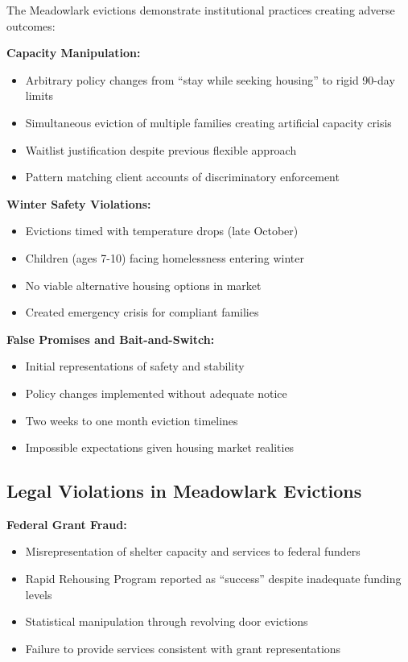 \documentclass[12pt,oneside]{article}
\begin{document}
The Meadowlark evictions demonstrate institutional practices creating adverse outcomes:

\textbf{Capacity Manipulation:}
\begin{itemize}
\item Arbitrary policy changes from ``stay while seeking housing'' to rigid 90-day limits
\item Simultaneous eviction of multiple families creating artificial capacity crisis
\item Waitlist justification despite previous flexible approach
\item Pattern matching client accounts of discriminatory enforcement
\end{itemize}

\textbf{Winter Safety Violations:}
\begin{itemize}
\item Evictions timed with temperature drops (late October)
\item Children (ages 7-10) facing homelessness entering winter
\item No viable alternative housing options in market
\item Created emergency crisis for compliant families
\end{itemize}

\textbf{False Promises and Bait-and-Switch:}
\begin{itemize}
\item Initial representations of safety and stability
\item Policy changes implemented without adequate notice
\item Two weeks to one month eviction timelines
\item Impossible expectations given housing market realities
\end{itemize}

\subsection*{Legal Violations in Meadowlark Evictions}

\textbf{Federal Grant Fraud:}
\begin{itemize}
\item Misrepresentation of shelter capacity and services to federal funders
\item Rapid Rehousing Program reported as ``success'' despite inadequate funding levels
\item Statistical manipulation through revolving door evictions
\item Failure to provide services consistent with grant representations
\end{itemize}
\end{document}
